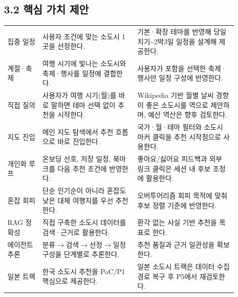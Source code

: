 \documentclass[12pt,a4paper]{article}
\newcommand{\DocNeedspace}[1]{\par\ifdim\dimexpr\pagegoal-\pagetotal\relax<#1\newpage\fi}
\renewcommand{\arraystretch}{1.35}
\begin{document}
\DocNeedspace{24\baselineskip}
\subsection*{3.2 핵심 가치 제안}


\DocNeedspace{28\baselineskip}
\begin{footnotesize}
\setlength{\tabcolsep}{3pt}
\setlength{\extrarowheight}{1pt}
\renewcommand{\arraystretch}{1.48}
\begin{longtable}{@{}>{\RaggedRight\arraybackslash}m{0.140\linewidth}>{\RaggedRight\arraybackslash}m{0.380\linewidth}>{\RaggedRight\arraybackslash}m{0.402\linewidth}@{}}
\toprule
\multicolumn{1}{>{\centering\arraybackslash}m{0.140\linewidth}}{\textbf{가치 항목}} & \multicolumn{1}{>{\centering\arraybackslash}m{0.380\linewidth}}{\textbf{핵심 가치}} & \multicolumn{1}{>{\centering\arraybackslash}m{0.402\linewidth}}{\textbf{적용 기준}} \\
\midrule
\endhead
집중 일정 & 사용자 조건에 맞는 소도시 1곳을 선정한다. & 기본·확장 테마를 반영해 당일치기\textasciitilde{}2박3일 일정을 설계해 제공한다. \\
계절·축제 & 여행 시기에 빛나는 소도시와 축제·행사를 일정에 결합한다. & 사용자가 포함을 선택한 축제·행사만 일정 구성에 반영한다. \\
직접 질의 & 사용자가 여행 시기(월)를 바로 말하면 테마 선택 없이 추천을 시작한다. & Wikipedia 기반 월별 날씨 경향이 좋은 소도시를 역으로 제안하며, 예산 역산은 향후 검토한다. \\
지도 진입 & 메인 지도 탐색에서 추천 흐름으로 바로 진입한다. & 국가·월·테마 필터와 소도시 마커 클릭을 추천 시작점으로 사용한다. \\
개인화 루프 & 온보딩 선호, 저장 일정, 북마크를 다음 추천 조건에 반영한다. & 좋아요/싫어요 피드백과 외부 링크 클릭은 세션 내 후보 조정에 활용한다. \\
혼잡 회피 & 단순 인기순이 아니라 혼잡도 낮은 대체 여행지를 우선 추천한다. & 오버투어리즘 회피 목적에 맞춰 후보 정렬 기준에 반영한다. \\
RAG 정확성 & 직접 구축한 소도시 데이터를 검색·근거로 활용한다. & 환각 없는 사실 기반 추천을 목표로 한다. \\
에이전트 추론 & 분류$\rightarrow$검색$\rightarrow$선정$\rightarrow$일정 구성을 단계별로 추론한다. & 추천 품질과 근거 일관성을 확보한다. \\
일본 트랙 & 한국 소도시 추천을 PoC/P1 핵심으로 제공한다. & 일본 소도시 트랙은 데이터 수집 경로 복구 후 P5에서 재검토한다. \\
\bottomrule
\end{longtable}
\end{footnotesize}
\end{document}
